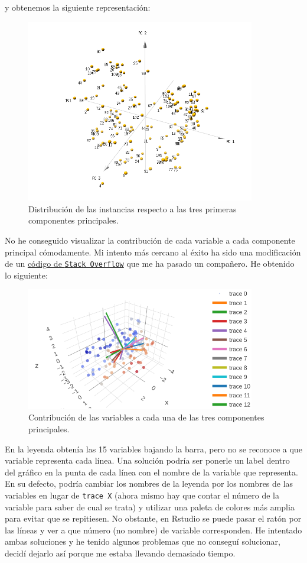 \documentclass[12pt]{article}
\begin{document}
y obtenemos la siguiente representación:
\begin{figure}[H]
  \centering
  \includegraphics[width=100mm]{imgs/pca3d-instancias}
  \caption{Distribución de las instancias respecto a las tres primeras
    componentes principales.}
  \label{fig:pca3d-instancias}
\end{figure}

No he conseguido visualizar la contribución de cada variable a cada
componente principal cómodamente. Mi intento más cercano al éxito ha
sido una modificación de un
\href{https://stackoverflow.com/questions/44393823/3d-biplot-in-plotly-r}{código
  de \texttt{Stack Overflow}} que me ha pasado un compañero. He
obtenido lo siguiente:
\begin{figure}[H]
  \centering
  \includegraphics[width=100mm]{imgs/pca3d-variables}
  \caption{Contribución de las variables a cada una de las tres componentes principales.}
\end{figure}

En la leyenda obtenía las 15 variables bajando la barra, pero no se
reconoce a que variable representa cada línea. Una solución podría ser
ponerle un label dentro del gráfico en la punta de cada línea con el
nombre de la variable que representa. En su defecto, podría cambiar
los nombres de la leyenda por los nombres de las variables en lugar de
\texttt{trace X} (ahora mismo hay que contar el número de la variable
para saber de cual se trata) y utilizar una paleta de colores más
amplia para evitar que se repitiesen. No obstante, en Rstudio se puede pasar
el ratón por las líneas y ver a que número (no nombre) de variable
corresponden. He intentado ambas soluciones y he tenido algunos
problemas que no conseguí solucionar, decidí dejarlo así porque me
estaba llevando demasiado tiempo.
\end{document}
